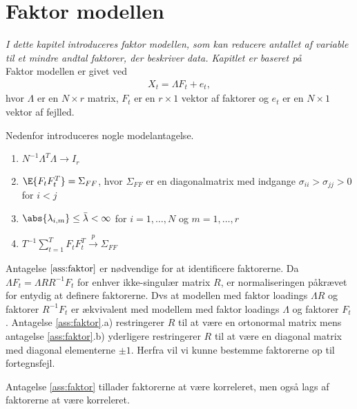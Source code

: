 \chapter{Faktor modellen}
\textit{I dette kapitel introduceres faktor modellen, som kan reducere antallet af variable til et mindre andtal faktorer, der beskriver data. 
Kapitlet er baseret på \citep{stock_watson_2002a}} \\[2mm]
%
Faktor modellen er givet ved
\begin{align}
X_t = \Lambda F_t + e_t, \label{eq:factor_model}
\end{align}
hvor \(\Lambda\) er en \(N \times r\) matrix, \(F_t\) er en \(r \times 1\) vektor af faktorer og \(e_t\) er en \(N \times 1\) vektor af fejlled.

Nedenfor introduceres nogle modelantagelse.
%
\begin{ass} \label{ass:faktor}
\begin{enumerate}
\item \(N^{-1} \Lambda^T \Lambda \rightarrow I_r\)
\item \(\E{F_t F_t^T} = \Sigma_{FF}\), hvor \(\Sigma_{FF}\) er en diagonalmatrix med indgange \(\sigma_{ii} > \sigma_{jj} > 0\) for \(i < j\)
\item \(\abs{\lambda_{i,m}} \leq \bar{\lambda} < \infty\) for \(i = 1, \ldots, N\) og \(m = 1, \ldots, r\)
\item \(T^{-1} \sum_{t=1}^T F_t F_t^T \overset{p}{\rightarrow} \Sigma_{FF}\) 
\end{enumerate}
\end{ass}
%
Antagelse \(\ref{ass:faktor}\) er nødvendige for at identificere faktorerne.
Da \(\Lambda F_t = \Lambda R R^{-1} F_t\) for enhver ikke-singulær matrix \(R\), er normaliseringen påkrævet for entydig at definere faktorerne.
Dvs at modellen med faktor loadings \(\Lambda R\) og faktorer \(R^{-1} F_t\) er ækvivalent med modellem med faktor loadings \(\Lambda\) og faktorer \(F_t\).
Antagelse \ref{ass:faktor}.a) restringerer \(R\) til at være en ortonormal matrix mens antagelse \ref{ass:faktor}.b) yderligere restringerer \(R\) til at være en diagonal matrix med diagonal elementerne \(\pm 1\).
Herfra vil vi kunne bestemme faktorerne op til fortegnsfejl.

Antagelse \ref{ass:faktor} tillader faktorerne at være korreleret, men også lags af faktorerne at være korreleret.

